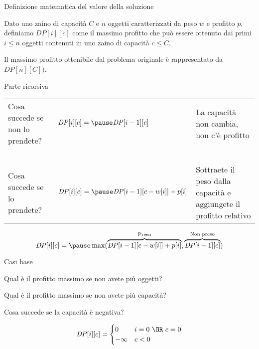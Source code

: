 \begin{frame}{Definizione matematica del valore della soluzione}

\vspace{-9pt}
\begin{myboxtitle}
Dato uno zaino di capacità $C$ e $n$ oggetti caratterizzati
da peso $w$ e profitto $p$, definiamo $\mathit{DP}[i][c]$ come il
massimo profitto che può essere ottenuto dai primi $i \leq n$
oggetti contenuti in uno zaino di capacità $c \leq C$.
\end{myboxtitle}

\begin{myboxtitle}
Il massimo profitto ottenibile dal problema originale è rappresentato da $\mathit{DP}[n][C])$.
\end{myboxtitle}

\end{frame}


\begin{frame}{Parte ricorsiva}

\vspace{-9pt}

\bigskip
\begingroup
\renewcommand*{\arraystretch}{1.2}
\begin{tabular}{P{2.8cm}P{3.9cm}P{4.0cm}}
Cosa succede se non lo prendete? & $\mathit{DP}[i][c] = \pause\newline \mathit{DP}[i-1][c]$ & La capacità non cambia, non c'è profitto \\
~\\
Cosa succede se lo prendete? & $\mathit{DP}[i][c] = \pause \mathit{DP}[i-1][c-w[i]] + p[i]$ & Sottraete il peso dalla capacità e aggiungete il profitto relativo \\
\end{tabular}
\endgroup


\[
\mathit{DP}[i][c] = \pause \max( \overbrace{\mathit{DP}[i-1][c-w[i]]+p[i]}^{\textrm{Preso}},\overbrace{\mathit{DP}[i-1][c]}^{\textrm{Non preso}} )
\]

\end{frame}


\begin{frame}{Casi base}

\vspace{-9pt}

\pause
\BIL
\item Qual è il profitto massimo se non avete più oggetti?
\item Qual è il profitto massimo se non avete più capacità?
\item Cosa succede se la capacità è negativa?
\EIL

\pause
\[
\mathit{DP}[i][c] = \begin{cases}
  0 & i=0\ \OR\ c=0 \\
  -\infty & c < 0
\end{cases}
\]

\end{frame}

